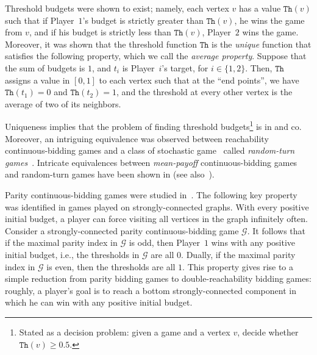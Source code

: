 \documentclass{article}\providecommand{\nequiv}{\not\equiv}\usepackage[a4paper,margin=20mm]{geometry}
\newcommand{\PO}{Player~$1$\xspace}
\newcommand{\PT}{Player~$2$\xspace}
\newcommand{\PLi}{Player~$i$\xspace}
\newcommand{\G}{{\mathcal G}}
\newcommand{\thresh}{\texttt{Th}\xspace}
\renewcommand{\set}[1]{\{ #1  \}}
\begin{document}
Threshold budgets were shown to exist; namely, each vertex $v$ has a value $\thresh(v)$ such that if \PO's budget is strictly greater than $\thresh(v)$, he wins the game from $v$, and if his budget is strictly less than $\thresh(v)$, \PT wins the game. Moreover, it was shown that the threshold function $\thresh$ is the {\em unique} function that satisfies the following property, which we call the {\em average property}. Suppose that the sum of budgets is $1$, and $t_i$ is \PLi's target, for $i \in \set{1,2}$. Then, $\thresh$ assigns a value in $[0,1]$ to each vertex such that at the ``end points'', we have $\thresh(t_1) = 0$ and $\thresh(t_2) = 1$, and the threshold at every other vertex is the average of two of its neighbors. 

Uniqueness implies that the problem of finding threshold budgets\footnote{Stated as a decision problem: given a game and a vertex $v$, decide whether $\thresh(v) \geq 0.5$.} is in \NP and co\NP. Moreover, an intriguing equivalence was observed between reachability continuous-bidding  games and a class of stochastic game~\cite{Con92} called {\em random-turn games}~\cite{PSSW09}. Intricate equivalences between {\em mean-payoff} continuous-bidding games and random-turn games have been shown in \cite{AHC19,AHI18,AHZ21,AJZ21} (see also~\cite{AH20}). 

Parity continuous-bidding games were studied in~\cite{AHC19}. The following key property was identified in games played on strongly-connected graphs. With every positive initial budget, a player can force visiting all vertices in the graph infinitely often. Consider a strongly-connected parity continuous-bidding game $\G$. It follows that if the maximal parity index in $\G$ is odd, then \PO wins with any positive initial budget, i.e., the thresholds in $\G$ are all $0$. Dually, if the maximal parity index in $\G$ is even, then the thresholds are all $1$. This property gives rise to a simple reduction from parity bidding games to double-reachability bidding  games: roughly, a player's goal is to reach a bottom strongly-connected component in which he can win with any positive initial budget. 
\end{document}
